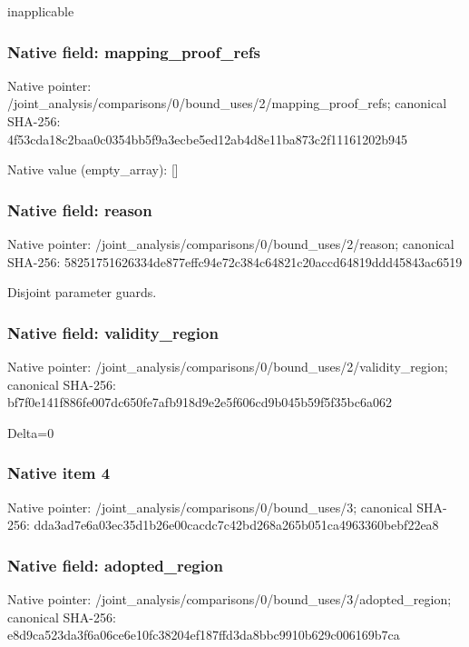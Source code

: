\documentclass[10pt,a4paper]{article}
\begin{document}
\begingroup\raggedright\sloppy inapplicable\par\endgroup

\subsubsection{Native field: mapping\_\allowbreak{}proof\_\allowbreak{}refs}
Native pointer: /joint\_\allowbreak{}analysis/comparisons/0/bound\_\allowbreak{}uses/2/mapping\_\allowbreak{}proof\_\allowbreak{}refs; canonical SHA-256: 4f53cda18c2baa0c0354bb5f9a3ecbe5ed12ab4d8e11ba873c2f11161202b945

Native value (empty\_\allowbreak{}array): []

\subsubsection{Native field: reason}
Native pointer: /joint\_\allowbreak{}analysis/comparisons/0/bound\_\allowbreak{}uses/2/reason; canonical SHA-256: 58251751626334de877effc94e72c384c64821c20accd64819ddd45843ac6519

\begingroup\raggedright\sloppy Disjoint parameter guards.\par\endgroup

\subsubsection{Native field: validity\_\allowbreak{}region}
Native pointer: /joint\_\allowbreak{}analysis/comparisons/0/bound\_\allowbreak{}uses/2/validity\_\allowbreak{}region; canonical SHA-256: bf7f0e141f886fe007dc650fe7afb918d9e2e5f606cd9b045b59f5f35bc6a062

\begingroup\raggedright\sloppy Delta=\allowbreak{}0\par\endgroup

\subsubsection{Native item 4}
Native pointer: /joint\_\allowbreak{}analysis/comparisons/0/bound\_\allowbreak{}uses/3; canonical SHA-256: dda3ad7e6a03ec35d1b26e00cacdc7c42bd268a265b051ca4963360bebf22ea8

\subsubsection{Native field: adopted\_\allowbreak{}region}
Native pointer: /joint\_\allowbreak{}analysis/comparisons/0/bound\_\allowbreak{}uses/3/adopted\_\allowbreak{}region; canonical SHA-256: e8d9ca523da3f6a06ce6e10fc38204ef187ffd3da8bbc9910b629c006169b7ca
\end{document}

